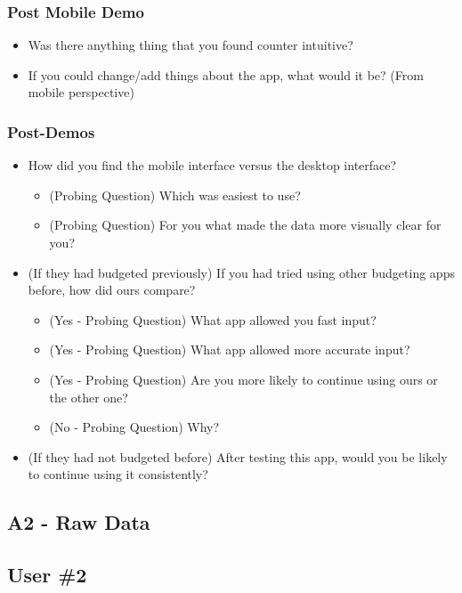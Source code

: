 \documentclass{chi2011}
\begin{document}
	\subsubsection{Post Mobile Demo}
	\begin{itemize}[noitemsep]
		\item Was there anything thing that you found counter intuitive?
		\item If you could change/add things about the app, what would it be? (From mobile perspective)
	\end{itemize}


	\subsubsection{Post-Demos}
	\begin{itemize}[noitemsep]
		\item How did you find the mobile interface versus the desktop interface?
		\begin{itemize}[noitemsep]
			\item (Probing Question) Which was easiest to use?
			\item (Probing Question) For you what made the data more visually clear for you?
		\end{itemize}	
	\item (If they had budgeted previously) If you had tried using other budgeting apps before, how did ours compare?
		\begin{itemize}[noitemsep]
			\item (Yes - Probing Question) What app allowed you fast input?
			\item (Yes - Probing Question) What app allowed more accurate input?
			\item (Yes - Probing Question) Are you more likely to continue using ours or the other one?
			\item (No - Probing Question) Why?
		\end{itemize}
	\item (If they had not budgeted before) After testing this app, would you be likely to continue using it consistently? 
	\end{itemize}
	
	
	\subsection{A2 - Raw Data}
	\subsection{User \#2}
\end{document}
